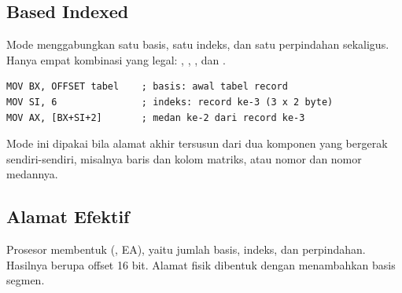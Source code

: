 \subsection{Based Indexed}

Mode  menggabungkan satu basis, satu indeks, dan
satu perpindahan sekaligus. Hanya empat kombinasi yang legal:
\code{[BX+SI+disp]}, \code{[BX+DI+disp]}, \code{[BP+SI+disp]}, dan
\code{[BP+DI+disp]}.

\begin{lstlisting}[language=MASM, numbers=none]
MOV BX, OFFSET tabel    ; basis: awal tabel record
MOV SI, 6               ; indeks: record ke-3 (3 x 2 byte)
MOV AX, [BX+SI+2]       ; medan ke-2 dari record ke-3
\end{lstlisting}

Mode ini dipakai bila alamat akhir tersusun dari dua komponen yang
bergerak sendiri-sendiri, misalnya baris dan kolom matriks, atau
nomor  dan nomor medannya.

\subsection{Alamat Efektif}

Prosesor membentuk  (,
EA), yaitu jumlah basis, indeks, dan perpindahan. Hasilnya berupa
offset 16 bit. Alamat fisik dibentuk dengan menambahkan basis segmen.

